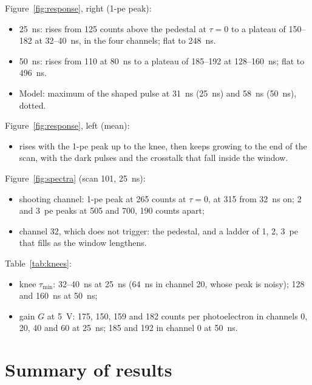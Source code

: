 \documentclass[11pt,a4paper]{article}
\begin{document}
Figure~\ref{fig:response}, right (1-pe peak):
\begin{itemize}
\item 25~ns: rises from 125 counts above the pedestal at $\tau = 0$ to a plateau of 150--182
  at 32--40~ns, in the four channels; flat to 248~ns.
\item 50~ns: rises from 110 at 80~ns to a plateau of 185--192 at 128--160~ns; flat to 496~ns.
\item Model: maximum of the shaped pulse at 31~ns (25~ns) and 58~ns (50~ns), dotted.
\end{itemize}
Figure~\ref{fig:response}, left (mean):
\begin{itemize}
\item rises with the 1-pe peak up to the knee, then keeps growing to the end of the scan,
  with the dark pulses and the crosstalk that fall inside the window.
\end{itemize}
Figure~\ref{fig:spectra} (scan 101, 25~ns):
\begin{itemize}
\item shooting channel: 1-pe peak at 265 counts at $\tau = 0$, at 315 from 32~ns on; 2 and
  3~pe peaks at 505 and 700, 190 counts apart;
\item channel 32, which does not trigger: the pedestal, and a ladder of 1, 2, 3~pe that fills
  as the window lengthens.
\end{itemize}
Table~\ref{tab:knees}:
\begin{itemize}
\item knee $\tau_\mathrm{min}$: 32--40~ns at 25~ns (64~ns in channel 20, whose peak is noisy);
  128 and 160~ns at 50~ns;
\item gain $G$ at 5~V: 175, 150, 159 and 182 counts per photoelectron in channels 0, 20, 40
  and 60 at 25~ns; 185 and 192 in channel 0 at 50~ns.
\end{itemize}

\section{Summary of results}
\end{document}
